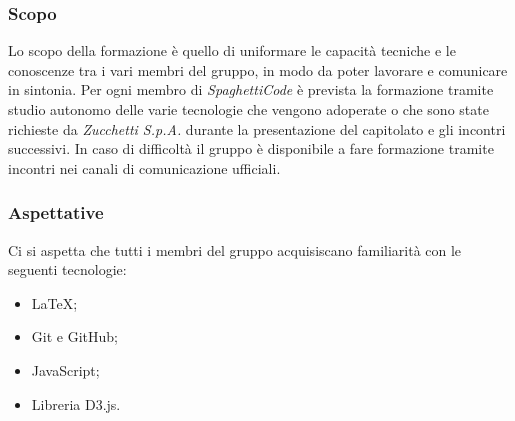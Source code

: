 \subsubsection{Scopo}

Lo scopo della formazione è quello di uniformare le capacità tecniche e le conoscenze tra i vari membri del gruppo, in modo da poter 
lavorare e comunicare in sintonia. Per ogni membro di \emph{SpaghettiCode} è prevista la formazione tramite studio autonomo delle varie 
tecnologie che vengono adoperate o che sono state richieste da \emph{Zucchetti S.p.A.} durante la presentazione del capitolato e gli 
incontri successivi. In caso di difficoltà il gruppo è disponibile a fare formazione tramite incontri nei canali di comunicazione ufficiali.

\subsubsection{Aspettative}

Ci si aspetta che tutti i membri del gruppo acquisiscano familiarità con le seguenti tecnologie:
\begin{itemize}
    \item \LaTeX;
    \item Git e GitHub;
    \item JavaScript;
    \item Libreria D3.js.
\end{itemize}
